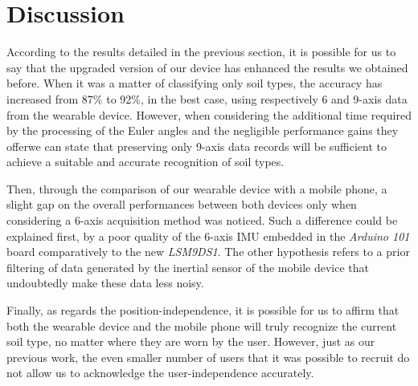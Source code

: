 \documentclass[10pt,conference]{IEEEtran}
\begin{document}
\section{Discussion}

According to the results detailed in the previous section, it is possible for us to say that the upgraded version of our device has enhanced the results we obtained before. When it was a matter of classifying only soil types, the accuracy has increased from 87\% to 92\%, in the best case, using respectively 6 and 9-axis data from the wearable device. However, when considering the additional time required by the processing of the Euler angles and the negligible performance gains they offer\textemdash we can state that preserving only 9-axis data records will be sufficient to achieve a suitable and accurate recognition of soil types.

Then, through the comparison of our wearable device with a mobile phone, a slight gap on the overall performances between both devices only when considering a 6-axis acquisition method was noticed. Such a difference could be explained first, by a poor quality of the 6-axis IMU embedded in the \textit{Arduino 101} board comparatively to the new \textit{LSM9DS1}. The other hypothesis refers to a prior filtering of data generated by the inertial sensor of the mobile device that undoubtedly make these data less noisy.

Finally, as regards the position-independence, it is possible for us to affirm that both the wearable device and the mobile phone will truly recognize the current soil type, no matter where they are worn by the user. However, just as our previous work, the even smaller number of users that it was possible to recruit do not allow us to acknowledge the user-independence accurately.

\end{document}
